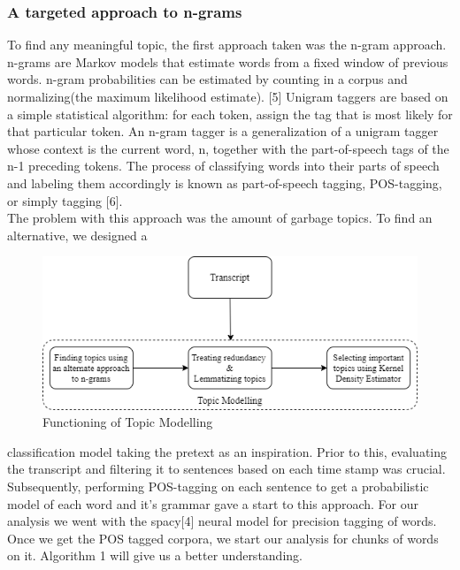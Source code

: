 \documentclass[conference]{IEEEtran}
\begin{document}
\subsubsection{\textbf{A targeted approach to n-grams}}
To find any meaningful topic, the first approach taken was the n-gram approach. n-grams are Markov models that estimate words from a fixed window of previous words. n-gram probabilities can be estimated by counting in a corpus and normalizing(the maximum likelihood estimate). [5] Unigram taggers are based on a simple statistical algorithm: for each token, assign the tag that is most likely for that particular token. An n-gram tagger is a generalization of a unigram tagger whose context is the current word, n, together with the part-of-speech tags of the n-1 preceding tokens. The process of classifying words into their parts of speech and labeling them accordingly is known as part-of-speech tagging, POS-tagging, or simply tagging [6].\\
\indent The problem with this approach was the amount of garbage topics. To find an alternative, we designed a 
\begin{figure}[H]
  \includegraphics[width=\linewidth]{image1.png}
  \caption{Functioning of Topic Modelling}
  \label{fig:Topic Modelling}
\end{figure}

classification model taking the pretext as an inspiration. Prior to this, evaluating the transcript and filtering it to sentences based on each time stamp was crucial. Subsequently, performing POS-tagging on each sentence to get a probabilistic model of each word and it’s grammar gave a start to this approach. For our analysis we went with the spacy[4] neural model for precision tagging of words. Once we get the POS tagged corpora, we start our analysis for chunks of words on it. Algorithm 1 will give us a better understanding.
\end{document}
